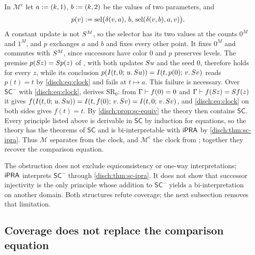 \begin{remark}
\label{disch:rem:sc-fusion}
In $\mathcal M^{\mathrm c}$ let $a\mathrel{:=}(k,1)$, $b\mathrel{:=}(k,2)$ be the values
of two parameters, and
\[
 p(v)\mathrel{:=}\operatorname{sel}\bigl(\delta(v,a),\,b,\,\operatorname{sel}(\delta(v,b),a,v)\bigr).
\]
A constant update is not $S^M$, so the selector has its two values at the
counts $0^M$ and $1^M$, and $p$ exchanges $a$ and $b$ and fixes every other
point. It fixes $0^M$ and commutes with $S^M$, since successors have color
$0$ and $p$ preserves levels. The premise $p(S z)=S p(z)$ of
, with both updates $S u$ and the seed $0$, therefore holds
for every $z$, while its conclusion
$p(I(t,0;\,u.\,S u))=I(t,p(0);\,v.\,S v)$ reads $p(t)=t$ by
\eqref{disch:eq:clock} and fails at $t\mapsto a$. This failure is
necessary. Over $\mathsf{SC}^{-}$ with \eqref{disch:eq:clock},
 derives $\mathrm{SR}_0$: from $\Gamma\vdash f(0)=0$ and
$\Gamma\vdash f(S z)=S f(z)$ it gives
$f(I(t,0;\,u.\,S u))=I(t,f(0);\,v.\,S v)=I(t,0;\,v.\,S v)$, and
\eqref{disch:eq:clock} on both sides gives $f(t)=t$. By
\cref{disch:prop:sc-equiv} the theory then contains $\mathsf{SC}$. Every
principle listed above is derivable in $\mathsf{SC}$ by induction for
equations, so the theory has the theorems of $\mathsf{SC}$ and is
bi-interpretable with $\mathsf{iPRA}$ by \cref{disch:thm:sc-ipra}.
Thus $\mathcal M$ separates  from the clock, and
$\mathcal M^{\mathrm c}$ the clock from ; together they
recover the comparison equation.
\end{remark}

The obstruction does not exclude equiconsistency or one-way
interpretations; $\mathsf{iPRA}$ interprets $\mathsf{SC}^{-}$ through
\cref{disch:thm:sc-ipra}. It does not show that successor injectivity is the
only principle whose addition to $\mathsf{SC}^{-}$ yields a bi-interpretation
on another domain. Both structures refute coverage; the next subsection
removes that limitation.

\subsection{Coverage does not replace the comparison equation}
\label{disch:sec:scalar-cov}

